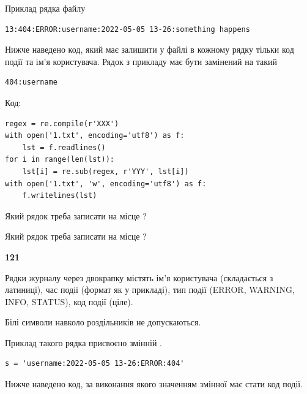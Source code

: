 Приклад рядка файлу



\begin{verbatim}
13:404:ERROR:username:2022-05-05 13-26:something happens
\end{verbatim}


Нижче наведено код, який має залишити у файлі в кожному рядку тільки код події та ім'я користувача. Рядок з прикладу має бути замінений на такий



\begin{verbatim}
404:username
\end{verbatim}




Код:



\begin{verbatim}
regex = re.compile(r'XXX')
with open('1.txt', encoding='utf8') as f:
    lst = f.readlines()
for i in range(len(lst)):
    lst[i] = re.sub(regex, r'YYY', lst[i])
with open('1.txt', 'w', encoding='utf8') as f:
    f.writelines(lst)
\end{verbatim}







Який рядок треба записати на місце  ?\par
\vspace{5mm}


Який рядок треба записати на місце  ?\par


\newpage

{\begin {center}\textbf{ 121}\end {center}}\par
Рядки журналу через двокрапку містять ім'я користувача (складається з латиниці), час події (фор\-мат як у прикладі), тип події (ERROR, WARNING, INFO, STATUS), код події (ціле).

Білі символи навколо роздільників не допускаються.

Приклад такого рядка присвоєно змінній .



\begin{verbatim}
s = 'username:2022-05-05 13-26:ERROR:404'
\end{verbatim}


Нижче наведено код, за виконання якого значенням змінної  має стати код події.

